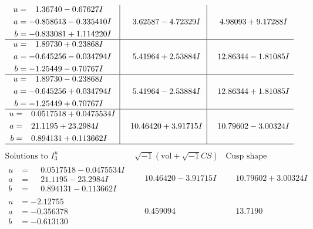 \documentclass[1p]{elsarticle_modified}
\theoremstyle{definition}
\newcommand{\I}{\sqrt{-1}}
\begin{document}
$$\begin{array}{c|c|c}
\begin{aligned}
u &= \phantom{-}1.36740 - 0.67627 I \\
a &= -0.858613 - 0.335410 I \\
b &= -0.833081 + 1.114220 I\end{aligned}
 & \phantom{-}3.62587 - 4.72329 I & \phantom{-}4.98093 + 9.17288 I \\ \hline\begin{aligned}
u &= \phantom{-}1.89730 + 0.23868 I \\
a &= -0.645256 - 0.034794 I \\
b &= -1.25449 - 0.70767 I\end{aligned}
 & \phantom{-}5.41964 + 2.53884 I & \phantom{-}12.86344 - 1.81085 I \\ \hline\begin{aligned}
u &= \phantom{-}1.89730 - 0.23868 I \\
a &= -0.645256 + 0.034794 I \\
b &= -1.25449 + 0.70767 I\end{aligned}
 & \phantom{-}5.41964 - 2.53884 I & \phantom{-}12.86344 + 1.81085 I \\ \hline\begin{aligned}
u &= \phantom{-}0.0517518 + 0.0475534 I \\
a &= \phantom{-}21.1195 + 23.2984 I \\
b &= \phantom{-}0.894131 + 0.113662 I\end{aligned}
 & \phantom{-}10.46420 + 3.91715 I & \phantom{-}10.79602 - 3.00324 I\\
 \hline 
 \end{array}$$\newpage$$\begin{array}{c|c|c}  
\text{Solutions to }I^u_{3}& \I (\text{vol} + \sqrt{-1}CS) & \text{Cusp shape}\\
 \hline 
\begin{aligned}
u &= \phantom{-}0.0517518 - 0.0475534 I \\
a &= \phantom{-}21.1195 - 23.2984 I \\
b &= \phantom{-}0.894131 - 0.113662 I\end{aligned}
 & \phantom{-}10.46420 - 3.91715 I & \phantom{-}10.79602 + 3.00324 I \\ \hline\begin{aligned}
u &= -2.12755\phantom{ +0.000000I} \\
a &= -0.356378\phantom{ +0.000000I} \\
b &= -0.613130\phantom{ +0.000000I}\end{aligned}
 & \phantom{-}0.459094\phantom{ +0.000000I} & \phantom{-}13.7190\phantom{ +0.000000I} \\ \hline\begin{aligned}

\end{aligned}
\end{array}$$
\end{document}
